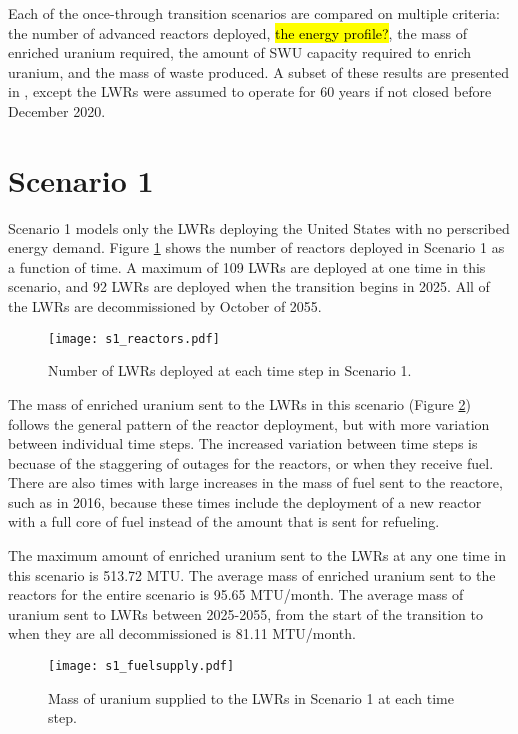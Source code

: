 
Each of the once-through transition scenarios are compared on multiple 
criteria: the number of advanced reactors deployed, \hl{the energy profile?}, 
the mass of enriched 
uranium required, the amount of \gls{SWU} capacity required to enrich uranium,
and the mass of waste produced. A subset of these results are presented
in \cite{bachmann_enrichment_2021}, except the \glspl{LWR} were assumed to 
operate for 60 years if not closed before December 2020. 

\section{Scenario 1}
Scenario 1 models only the \glspl{LWR} deploying the United States with no 
perscribed energy demand. Figure \ref{fig:reactor1} shows the number of 
reactors deployed in Scenario 1 as a function of time. A maximum of 109 
\glspl{LWR} are deployed at one time in this scenario, and 92 \glspl{LWR}
are deployed when the transition begins in 2025. All of the \glspl{LWR} are
decommissioned by October of 2055. 

\begin{figure}
    \centering
    \texttt{[image: s1\_reactors.pdf]}
    \caption{Number of LWRs deployed at each time step in Scenario 1.}
    \label{fig:reactor1}
\end{figure}

The mass of enriched uranium sent to the \glspl{LWR} in this scenario (Figure 
\ref{fig:fuel1}) follows the general pattern of the reactor deployment, but with 
more variation between individual time steps. The increased variation between 
time steps is becuase of the staggering of outages for the reactors, or when 
they receive fuel. There are also times with large increases in the mass of fuel 
sent to the reactore, such as in 2016, because these times include the deployment 
of a new reactor with a full core of fuel instead of the amount that is 
sent for refueling. 

The maximum amount of enriched uranium sent to the \glspl{LWR} at any one 
time in this scenario is 513.72 MTU. The average mass of enriched uranium sent to 
the reactors for the entire scenario is 95.65 MTU/month. The average mass of 
uranium sent to \glspl{LWR} between 2025-2055, from the start of the transition 
to when they are all decommissioned is 81.11 MTU/month. 

\begin{figure}
    \centering
    \texttt{[image: s1\_fuelsupply.pdf]}
    \caption{Mass of uranium supplied to the LWRs in Scenario 1 at each time step.}
    \label{fig:fuel1}
\end{figure}

